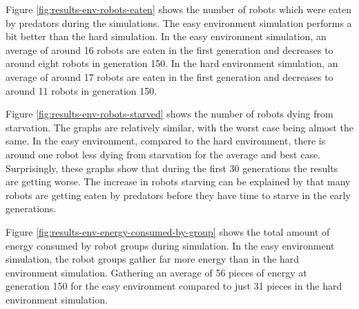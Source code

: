 Figure \ref{fig:results-env-robots-eaten} shows the number of robots which were eaten by predators during the simulations.
The easy environment simulation performs a bit better than the hard simulation.
In the easy environment simulation, an average of around 16 robots are eaten in the first generation and decreases to around eight robots in generation 150.
In the hard environment simulation, an average of around 17 robots are eaten in the first generation and decreases to around 11 robots in generation 150.

\vspace*{\fill}
\newpage
\vspace*{\fill}


Figure \ref{fig:results-env-robots-starved} shows the number of robots dying from starvation.
The graphs are relatively similar, with the worst case being almost the same.
In the easy environment, compared to the hard environment, there is around one robot less dying from starvation for the average and best case.
Surprisingly, these graphs show that during the first 30 generations the results are getting worse.
The increase in robots starving can be explained by that many robots are getting eaten by predators before they have time to starve in the early generations.  

\vspace*{\fill}
\newpage
\vspace*{\fill}


Figure \ref{fig:results-env-energy-consumed-by-group} shows the total amount of energy consumed by robot groups during simulation.
In the easy environment simulation, the robot groups gather far more energy than in the hard environment simulation.
Gathering an average of 56 pieces of energy at generation 150 for the easy environment compared to just 31 pieces in the hard environment simulation.

\vspace*{\fill}
\newpage
\vspace*{\fill}


